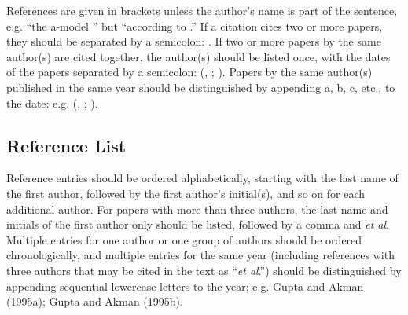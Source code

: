 \documentclass{ws-ijicc}
\begin{document}
References are given in brackets unless the author's name is part
of the sentence, e.g. ``the a-model \cite{gupta97}''
but ``according to \citeauthor{gupta97} .''
If a citation cites two or more papers, they should be separated
by a semicolon: \cite{gurland94,wong89}.
If two or more papers by the same author(s) are cited together, the
author(s) should be listed once, with the dates of the papers separated
by a semicolon:
(\citeauthor{gurland94}, \citeyear{gurland94}; \citeyear{gurland95}).
Papers by the same author(s) published in the same
year should be distinguished by appending a, b, c, etc., to the
date: e.g. (\citeauthor{gupta95a}, \citeyear{gupta95a}; \citeyear{gupta95b}).

\subsection*{Reference List}
Reference entries should be ordered alphabetically, starting with the
last name of the first author, followed by the first author's
initial(s), and so on for each additional author. For papers with more
than three authors, the last name and initials of the first author
only should be listed, followed by a comma and {\it et al}.  Multiple
entries for one author or one group of authors should be ordered
chronologically, and multiple entries for the same year (including
references with three authors that may be cited in the text as
``{\it et al}.'') should be distinguished by appending sequential
lowercase letters to the year; e.g. Gupta and Akman (1995a);
Gupta and Akman (1995b).
\end{document}
